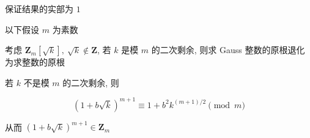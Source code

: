 保证结果的实部为 \(1\)

以下假设 \(m\) 为素数

考虑 \(\mathbf{Z}_m\left[\sqrt{k}\right],~\sqrt{k}\notin \mathbf{Z}\), 若 \(k\) 是模 \(m\) 的二次剩余, 则求 Gauss 整数的原根退化为求整数的原根

若 \(k\) 不是模 \(m\) 的二次剩余, 则

\[
    \left(1+b\sqrt{k}\right)^{m+1}\equiv 1+b^2 k^{(m+1)/2} \pmod m
\]

从而 \(\left(1+b\sqrt{k}\right)^{m+1}\in\mathbf{Z}_m\)
